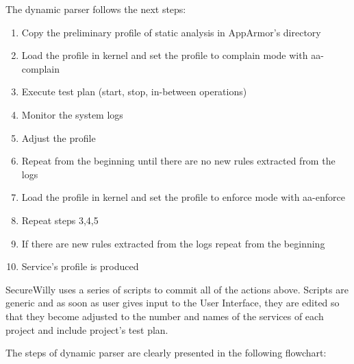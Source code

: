 The dynamic parser follows the next steps:
\begin{enumerate}
\item Copy the preliminary profile of static analysis in AppArmor's directory
\item Load the profile in kernel and set the profile to complain mode with aa-complain
\item Execute test plan (start, stop, in-between operations)
\item Monitor the system logs
\item Adjust the profile
\item Repeat from the beginning until there are no new rules extracted from the logs
\item Load the profile in kernel and set the profile to enforce mode with aa-enforce
\item Repeat steps 3,4,5
\item If there are new rules extracted from the logs repeat from the beginning
\item Service's profile is produced
\end{enumerate}

SecureWilly uses a series of scripts to commit all of the actions above. Scripts are generic and as soon as user gives input to the User Interface, they are edited so that they become adjusted to the number and names of the services of each project and include project's test plan.

The steps of dynamic parser are clearly presented in the following flowchart:

\hfill\break\hfill\break\hfill\break\hfill\break\hfill\break

